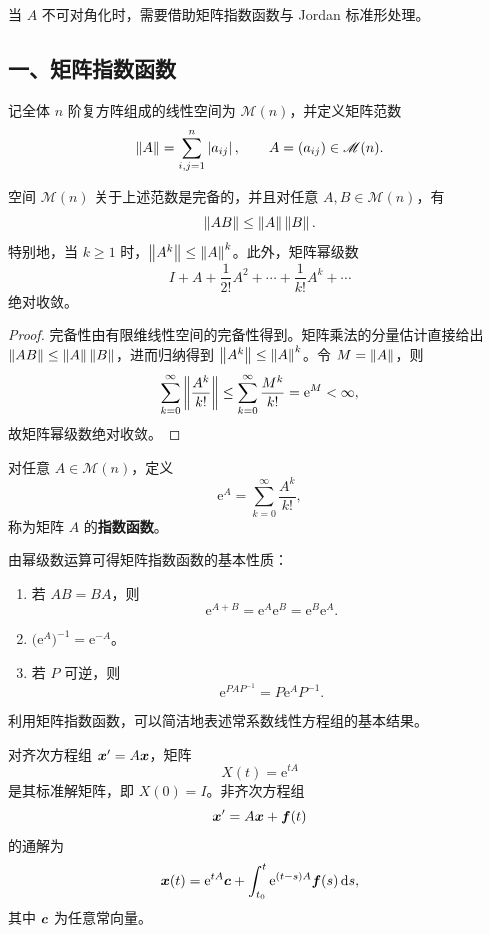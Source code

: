 当 $A$ 不可对角化时，需要借助矩阵指数函数与 Jordan 标准形处理。

\subsection*{一、矩阵指数函数}

记全体 $n$ 阶复方阵组成的线性空间为 $\mathscr{M}(n)$，并定义矩阵范数
\[
	\left\| A \right\|=\sum_{i,j=1}^{n}\left| a_{ij} \right|,
	\qquad A=(a_{ij})\in\mathscr{M}(n).
\]

\begin{lemma}\label{lem:矩阵指数级数的收敛性}
	空间 $\mathscr{M}(n)$ 关于上述范数是完备的，并且对任意
	$A,B\in\mathscr{M}(n)$，有
	\[
		\left\| AB \right\|\leq\left\| A \right\|\left\| B \right\|.
	\]
	特别地，当 $k\geq1$ 时，$\left\| A^k \right\|\leq\left\| A \right\|^k$。此外，矩阵幂级数
	\[
		I+A+\dfrac{1}{2!}A^2+\cdots+\dfrac{1}{k!}A^k+\cdots
	\]
	绝对收敛。
\end{lemma}

\begin{proof}
	完备性由有限维线性空间的完备性得到。矩阵乘法的分量估计直接给出
	$\left\| AB \right\|\leq\left\| A \right\|\left\| B \right\|$，进而归纳得到
	$\left\| A^k \right\|\leq\left\| A \right\|^k$。令 $M=\left\| A \right\|$，则
	\[
		\sum_{k=0}^{\infty}\left\| \dfrac{A^k}{k!} \right\|
		\leq\sum_{k=0}^{\infty}\dfrac{M^k}{k!}
		=\mathrm{e}^{M}<\infty,
	\]
	故矩阵幂级数绝对收敛。
\end{proof}

\begin{definition}\label{def:矩阵指数函数}
	对任意 $A\in\mathscr{M}(n)$，定义
	\[
		\mathrm{e}^{A}=\sum_{k=0}^{\infty}\dfrac{A^k}{k!},
	\]
	称为矩阵 $A$ 的\textbf{指数函数}。
\end{definition}

由幂级数运算可得矩阵指数函数的基本性质：

\begin{enumerate}
	\item 若 $AB=BA$，则
	\[
		\mathrm{e}^{A+B}
		=\mathrm{e}^{A}\mathrm{e}^{B}
		=\mathrm{e}^{B}\mathrm{e}^{A}.
	\]
	\item $\bigl(\mathrm{e}^{A}\bigr)^{-1}=\mathrm{e}^{-A}$。
	\item 若 $P$ 可逆，则
	\[
		\mathrm{e}^{PAP^{-1}}=P\mathrm{e}^{A}P^{-1}.
	\]
\end{enumerate}

利用矩阵指数函数，可以简洁地表述常系数线性方程组的基本结果。

\begin{theorem}\label{thm:常系数线性方程组的矩阵指数解}
	对齐次方程组 $\boldsymbol{x}'=A\boldsymbol{x}$，矩阵
	\[
		X(t)=\mathrm{e}^{tA}
	\]
	是其标准解矩阵，即 $X(0)=I$。非齐次方程组
	\[
		\boldsymbol{x}'=A\boldsymbol{x}+\boldsymbol{f}(t)
	\]
	的通解为
	\[
		\boldsymbol{x}(t)
		=\mathrm{e}^{tA}\boldsymbol{c}
		+\int_{t_0}^{t}\mathrm{e}^{(t-s)A}\boldsymbol{f}(s)\,\mathrm{d} s,
	\]
	其中 $\boldsymbol{c}$ 为任意常向量。
\end{theorem}

